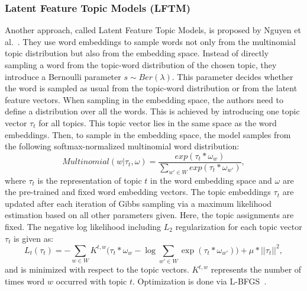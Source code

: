 \documentclass[
        a4paper,
        titlepage,
        twoside,
        parskip,
        numbers=noenddot
        ]{scrbook}
\theoremstyle{break}
\begin{document}
\subsubsection{Latent Feature Topic Models (LFTM)}
Another approach, called Latent Feature Topic Models, is proposed by Nguyen et al.~\cite{Nguyen2015}.
They use word embeddings to sample words not only from the multinomial topic distribution but also from the embedding space.
Instead of directly sampling a word from the topic-word distribution of the chosen topic, they introduce a Bernoulli parameter $s \sim Ber(\lambda)$.
This parameter decides whether the word is sampled as usual from the topic-word distribution or from the latent feature vectors.
When sampling in the embedding space, the authors need to define a distribution over all the words.
This is achieved by introducing one topic vector $\tau_t$ for all topics.
This topic vector lies in the same space as the word embeddings.
Then, to sample in the embedding space, the model samples from the following softmax-normalized multinomial word distribution:
\begin{equation*}
    Multinomial(w | \tau_t, \omega) = \frac{exp(\tau_t * \omega_w)}{\sum_{w' \in W} exp(\tau_t * \omega_{w'})},
\end{equation*}
where $\tau_t$ is the representation of topic $t$ in the word embedding space and $\omega$ are the pre-trained and fixed word embedding vectors.
The topic embeddings $\tau_t$ are updated after each iteration of Gibbs sampling via a maximum likelihood estimation based on all other parameters given.
Here, the topic assignments are fixed.
The negative log likelihood including $L_2$ regularization for each topic vector $\tau_t$ is given as:
\begin{equation*}
  L_t(\tau_t) = - \sum_{w \in W} K^{t,w} \Big(\tau_t * \omega_w - \log \sum_{w' \in W} \exp (\tau_t * \omega_{w'}) \Big) + \mu * || \tau_t ||^2,
\end{equation*}
and is minimized with respect to the topic vectors.
$K^{t,w}$ represents the number of times word $w$ occurred with topic $t$.
Optimization is done via L-BFGS~\cite{Liu1989}.
\end{document}
